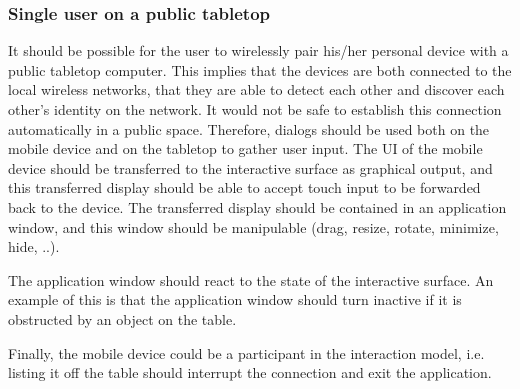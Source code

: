 \subsubsection{Single user on a public tabletop}

It should be possible for the user to wirelessly pair his/her personal device with a public tabletop computer.
This implies that the devices are both connected to the local wireless networks, that they are able to detect each other and discover each other's identity on the network.
It would not be safe to establish this connection automatically in a public space.
Therefore, dialogs should be used both on the mobile device and on the tabletop to gather user input.
The UI of the mobile device should be transferred to the interactive surface as graphical output, and this transferred display should be able to accept touch input to be forwarded back to the device.
The transferred display should be contained in an application window, and this window should be manipulable (drag, resize, rotate, minimize, hide, ..).

The application window should react to the state of the interactive surface.
An example of this is that the application window should turn inactive if it is obstructed by an object on the table.

Finally, the mobile device could be a participant in the interaction model, i.e. listing it off the table should interrupt the connection and exit the application.


